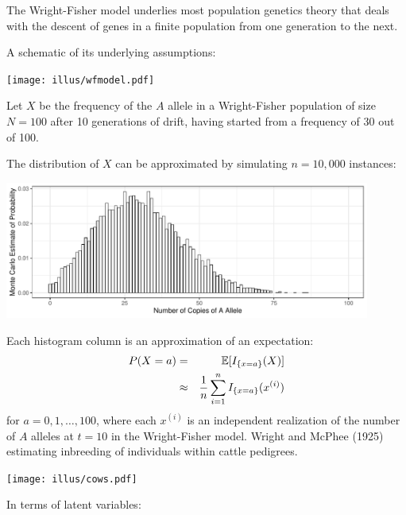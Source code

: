 The Wright-Fisher model underlies most population genetics theory that deals with the descent of genes in a finite population from one generation to the next.

A schematic of its underlying assumptions:
\begin{center}
\texttt{[image: illus/wfmodel.pdf]}
\end{center}

Let $X$ be the frequency of the $A$ allele in a Wright-Fisher population of size $N=100$ after 10 generations of drift, having started from a frequency of 30 out of 100.

\enlargethispage*{1000pt}
The distribution of $X$ can be approximated by simulating $n=10,000$ instances:
\begin{center}
\includegraphics[width=0.9\textwidth]{figures/wf-100-by-10.pdf}
\end{center} 
\newpage
Each histogram column is an approximation of an expectation:
\begin{eqnarray}
		P(X = a) & = & \Bbb{E}[I_{\{x=a\}}(X)] \nonumber  \\
		&\approx & \displaystyle \frac{1}{n}
		\sum_{i=1}^n I_{\{x=a\}}(x^{(i)}) \nonumber
\end{eqnarray}
for $a=0,1,\ldots,100$, where each $x^{(i)}$ is an independent realization of the 
number of $A$ alleles at $t=10$ in the Wright-Fisher model.
 Wright and McPhee (1925) estimating inbreeding of individuals within cattle pedigrees.
\begin{center}
\texttt{[image: illus/cows.pdf]}
\end{center}
In terms of latent variables:
